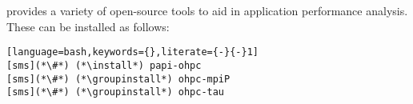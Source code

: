 \OHPC{} provides a variety of open-source tools to aid in application 
performance analysis. These can be installed as follows:

\begin{lstlisting}[language=bash,keywords={},literate={-}{-}1]
[sms](*\#*) (*\install*) papi-ohpc
[sms](*\#*) (*\groupinstall*) ohpc-mpiP
[sms](*\#*) (*\groupinstall*) ohpc-tau
\end{lstlisting}


